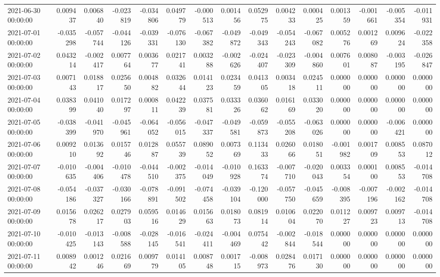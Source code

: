 \begin{tabular}{lrrrrrrrrrrrrrr}
2021-06-30 00:00:00 & 0.009437 & 0.006840 & -0.023819 & -0.034806 & 0.049779 & -0.000513 & 0.001456 & 0.052975 & 0.004233 & 0.000425 & 0.001359 & -0.001661 & -0.005354 & -0.011931 \\
2021-07-01 00:00:00 & -0.035298 & -0.057744 & -0.044126 & -0.039331 & -0.076130 & -0.067382 & -0.049872 & -0.049343 & -0.054243 & -0.067082 & 0.005276 & 0.001269 & 0.009624 & -0.022358 \\
2021-07-02 00:00:00 & 0.043214 & -0.002417 & 0.007764 & 0.003677 & 0.021741 & 0.003288 & -0.002626 & -0.024407 & -0.023309 & -0.004860 & 0.007601 & 0.008087 & -0.003195 & -0.026847 \\
2021-07-03 00:00:00 & 0.007143 & 0.018817 & 0.025650 & 0.004882 & 0.032644 & 0.014123 & 0.023459 & 0.041305 & 0.003418 & 0.024511 & 0.000000 & 0.000000 & 0.000000 & 0.000000 \\
2021-07-04 00:00:00 & 0.038399 & 0.041040 & 0.017297 & 0.000811 & 0.042239 & 0.037581 & 0.033326 & 0.036062 & 0.016169 & 0.033020 & 0.000000 & 0.000000 & 0.000000 & 0.000000 \\
2021-07-05 00:00:00 & -0.038399 & -0.041970 & -0.045961 & -0.064052 & -0.056015 & -0.047337 & -0.049581 & -0.059873 & -0.055208 & -0.063026 & 0.000000 & 0.000000 & -0.006421 & 0.000000 \\
2021-07-06 00:00:00 & 0.009210 & 0.013692 & 0.015746 & 0.012887 & 0.055739 & 0.089052 & 0.007369 & 0.113433 & 0.026066 & 0.018051 & -0.001982 & 0.001709 & 0.008553 & 0.087012 \\
2021-07-07 00:00:00 & -0.010635 & -0.004406 & -0.010478 & -0.044510 & -0.002375 & -0.014049 & -0.010928 & 0.163374 & -0.007710 & -0.020043 & 0.003354 & 0.000100 & 0.008553 & -0.014708 \\
2021-07-08 00:00:00 & -0.054186 & -0.037327 & -0.030166 & -0.078891 & -0.091502 & -0.074458 & -0.039104 & -0.120000 & -0.057750 & -0.045659 & -0.008395 & -0.007196 & -0.002162 & -0.014708 \\
2021-07-09 00:00:00 & 0.015678 & 0.026217 & 0.027903 & 0.059516 & 0.014629 & 0.015663 & 0.018073 & 0.081914 & 0.010604 & 0.022070 & 0.011227 & 0.009723 & 0.009713 & -0.014708 \\
2021-07-10 00:00:00 & -0.010425 & -0.013143 & -0.008588 & -0.028145 & -0.016541 & -0.024411 & -0.004469 & 0.075442 & -0.002844 & -0.018544 & 0.000000 & 0.000000 & 0.000000 & 0.000000 \\
2021-07-11 00:00:00 & 0.008942 & 0.001246 & 0.021669 & 0.009779 & 0.014105 & 0.008748 & 0.001715 & -0.008973 & 0.028476 & 0.017130 & 0.000000 & 0.000000 & 0.000000 & 0.000000 \\

\end{tabular}
